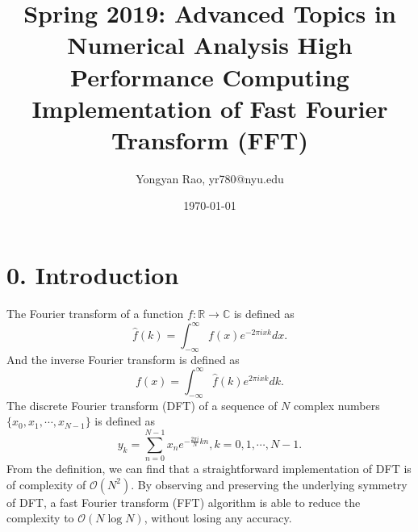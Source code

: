 \documentclass[amsmath,amssymb]{revtex4}
\begin{document}
\title{Spring 2019: Advanced Topics in Numerical Analysis High Performance Computing\\
Implementation of Fast Fourier Transform (FFT)}
\author{Yongyan Rao, yr780@nyu.edu}
\date{\today}
\maketitle


\section{\label{sec:sec0}0. Introduction}

The Fourier transform of a function $f: \mathbb{R}\to\mathbb{C}$ is defined as
\begin{equation}
\hat{f}(k)=\int^{\infty}_{-\infty}f(x)e^{-2\pi ixk}dx.
\end{equation}
And the inverse Fourier transform is defined as
\begin{equation}
f(x)=\int^{\infty}_{-\infty}\hat{f}(k)e^{2\pi ixk}dk.
\end{equation}
The discrete Fourier transform (DFT) of a sequence of $N$ complex numbers $\{x_0, x_1, \cdots, x_{N-1}\}$ is defined as
\begin{equation}
y_k = \sum^{N-1}_{n=0}x_ne^{-\frac{2\pi i}{N}kn}, k = 0, 1, \cdots, N-1.
\end{equation}
From the definition, we can find that a straightforward implementation of DFT is of complexity of $\mathcal{O}(N^2)$. By observing and preserving the underlying symmetry of DFT, a fast Fourier transform (FFT) algorithm is able to reduce the complexity to $\mathcal{O}(N\log N)$, without losing any accuracy.
\end{document}
